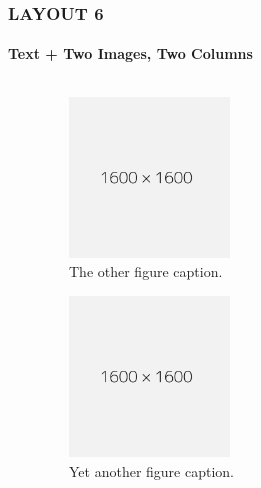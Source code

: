\documentclass[14 pt]{beamer}
\begin{document}

\begin{frame}[t]
\frametitle{LAYOUT 6}
\framesubtitle{Text + Two Images, Two Columns}

\begin{columns}[t]
  \begin{column}{0.45\textwidth}
    \lipsum[7]
    \vskip0.5cm%
    \lipsum[8]
  \end{column}

  \begin{column}{0.45\textwidth}
    \begin{figure}[t]
      \includegraphics[width=0.4\textwidth]{img/1600x1600.png}
      \caption{The other figure caption.}
    \end{figure}
    \begin{figure}[t]
      \includegraphics[width=0.4\textwidth]{img/1600x1600.png}
      \caption{Yet another figure caption.}
    \end{figure}
\end{column}

\end{columns}
\end{frame}

\end{document}
